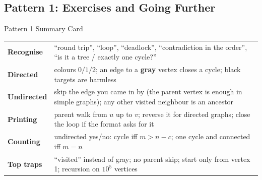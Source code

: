 \subsection{Pattern 1: Exercises and Going Further}
\label{ssec:ch2-p1-ex}

\begin{patternbox}{Pattern 1 Summary Card}
\renewcommand{\arraystretch}{1.25}
\begin{tabularx}{\linewidth}{@{}>{\bfseries}l X@{}}
Recognise & ``round trip'', ``loop'', ``deadlock'', ``contradiction in the order'', ``is it a tree / exactly one cycle?'' \\
Directed & colours $0/1/2$; an edge to a \textbf{gray} vertex closes a cycle; black targets are harmless \\
Undirected & skip the edge you came in by (the parent vertex is enough in simple graphs); any other visited neighbour is an ancestor \\
Printing & parent walk from $u$ up to $v$; reverse it for directed graphs; close the loop if the format asks for it \\
Counting & undirected yes/no: cycle iff $m > n - c$; one cycle and connected iff $m = n$ \\
Top traps & ``visited'' instead of gray; no parent skip; start only from vertex 1; recursion on $10^5$ vertices \\
\end{tabularx}
\end{patternbox}

